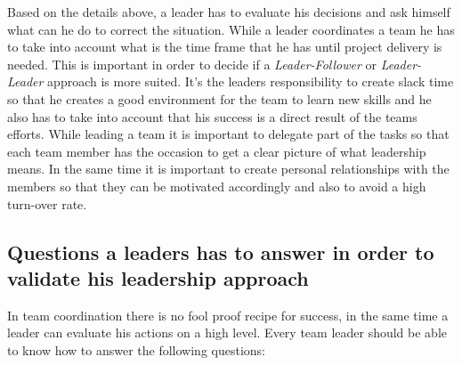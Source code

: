 Based on the details above, a leader has to evaluate his decisions and ask himself what can he do to correct the situation. While a leader coordinates a team he has to take into account what is the time frame that he has until project delivery is needed. This is important in order to decide if a \textit{Leader-Follower} or \textit{Leader-Leader} approach is more suited. It's the leaders responsibility to create slack time so that he creates a good environment for the team to learn new skills and he also has to take into account that his success is a direct result of the teams efforts. While leading a team it is important to delegate part of the tasks so that each team member has the occasion to get a clear picture of what leadership means. In the same time it is important to create personal relationships with the members so that they can be motivated accordingly and also to avoid a high turn-over rate.

\subsection{Questions a leaders has to answer in order to validate his leadership approach}
In team coordination there is no fool proof recipe for success, in the same time a leader can evaluate his actions on a high level. Every team leader should be able to know how to answer the following questions:

